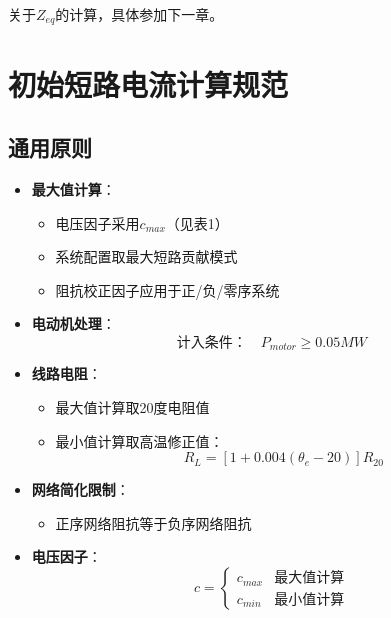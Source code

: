 \documentclass[a4paper,11pt,AutoFakeBold]{ctexart}
\begin{document}
关于$Z_{eq}$的计算，具体参加下一章。


\newpage



\newpage
\section{初始短路电流计算规范}
\subsection{通用原则}
\begin{itemize}
\item \textbf{最大值计算}：
  \begin{itemize}
  \item 电压因子采用$c_{max}$（见表1）
  \item 系统配置取最大短路贡献模式
  \item 阻抗校正因子应用于正/负/零序系统
  \end{itemize}

\item \textbf{电动机处理}：
  \begin{equation}
  \text{计入条件：} \quad P_{motor} \geq 0.05\si{MW} \label{eq:motor_cond}
  \end{equation}
\end{itemize}



\begin{itemize}
\item \textbf{线路电阻}：
  \begin{itemize}
  \item 最大值计算取20度电阻值
  \item 最小值计算取高温修正值：
    \[ R_L = [1+0.004(\theta_e-20)]R_{20} \]
  \end{itemize}

\item \textbf{网络简化限制}：
  \begin{itemize}
  \item 正序网络阻抗等于负序网络阻抗
  \end{itemize}
\end{itemize}
\newpage

\begin{itemize}
\item \textbf{电压因子}：
  \[ c = 
  \begin{cases} 
  c_{max} & \text{最大值计算} \\
  c_{min} & \text{最小值计算}
  \end{cases} \]
\end{itemize}
\end{document}
